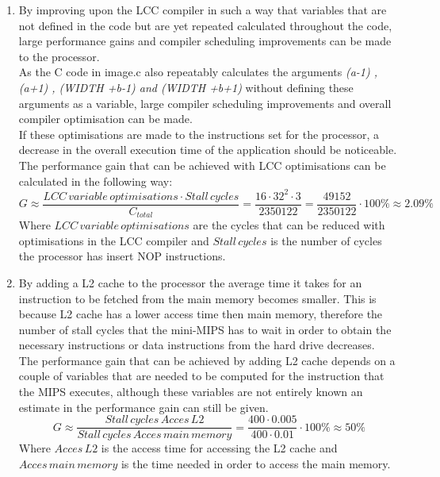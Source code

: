 \documentclass[10pt]{article}
\begin{document}
\begin{enumerate}

\item By improving upon the LCC compiler in such a way that variables that are not defined in the code but are yet repeated calculated throughout the code, large performance gains and compiler scheduling improvements can be made to the processor.\\
As the C code in image.c also repeatably calculates the arguments \textit{(a-1) , (a+1) , (WIDTH +b-1) and (WIDTH +b+1) } without defining these arguments as a variable, large compiler scheduling improvements and overall compiler optimisation can be made.\\

If these optimisations are made to the instructions set for the processor, a decrease in the overall execution time of the application should be noticeable.\\
The performance gain that can be achieved with LCC optimisations can be calculated in the following way:
\begin{equation}
  G \approx  \frac{LCC \, variable  \, optimisations \cdot Stall \, cycles}{C_{total}} = \frac{16 \cdot 32^2 \cdot 3}{2350122} = \frac{49152}{2350122} \cdot 100 \% \approx 2.09 \%
\end{equation}
Where $LCC \, variable \, optimisations $ are the cycles that can be reduced with optimisations in the LCC compiler and $ Stall \, cycles$ is the number of cycles the processor has insert NOP instructions.\\%

\item By adding a L2 cache to the processor the average time it takes for an instruction to be fetched from the main memory becomes smaller. This is because L2 cache has a lower access time then main memory, therefore the number of stall cycles that the mini-MIPS has to wait in order to obtain the necessary instructions or data instructions from the hard drive decreases.\\
The performance gain that can be achieved by adding L2 cache depends on a couple of variables that are needed to be computed for the instruction that the MIPS executes, although these variables are not entirely known an estimate in the performance gain can still be given.
\begin{equation}
    G \approx \frac{ Stall \, cycles \, Acces \, L2 }{ Stall \, cycles \, Acces \, main \, memory } = \frac{400 \cdot 0.005}{ 400 \cdot 0.01} \cdot 100\% \approx 50 \%
\end{equation}
Where $ Acces \, L2  $ is the access time for accessing the L2 cache and $Acces \, main \, memory $ is the time needed in order to access the main memory.\\



\end{enumerate}
\end{document}
